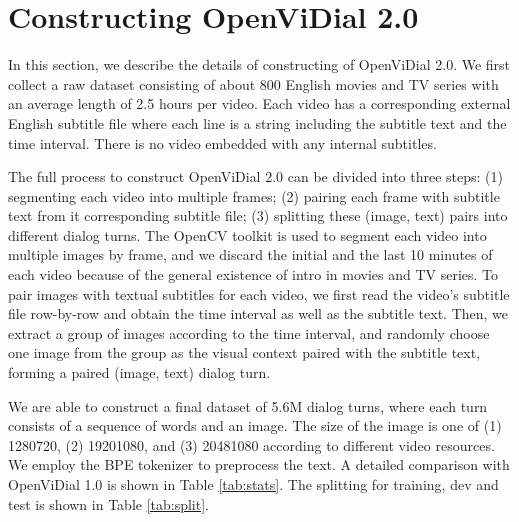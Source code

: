 \documentclass[11pt,a4paper]{article}
\begin{document}
\section{Constructing OpenViDial 2.0}
In this section, we describe the details of constructing of OpenViDial 2.0. We first collect a raw dataset consisting of about 800 English movies and TV series with an average length of 2.5 hours per video. Each video has a corresponding external English subtitle file where each line is a string including the subtitle text and the time interval. There is no video embedded with any internal subtitles.

The full process to construct OpenViDial 2.0 can be divided into three steps: (1) segmenting each video into multiple frames; (2) pairing each frame with subtitle text from it corresponding subtitle file; (3) splitting these (image, text) pairs into different dialog turns. The OpenCV \cite{opencv_library} toolkit is used to segment each video into multiple images by frame, and we discard the initial and the last 10 minutes of each video because of the general existence of intro in movies and TV series. To pair images with textual subtitles for each video, we first read the video's subtitle file row-by-row and obtain the time interval as well as the subtitle text. Then, we extract a group of images according to the time interval, and randomly choose one image from the group as the visual context paired with the subtitle text, forming a paired (image, text) dialog turn.

We are able to construct a final dataset of 5.6M dialog turns, where each turn consists of a sequence of words and an image. The size of the image is one of (1) 1280720, (2) 19201080, and (3) 20481080 according to different video resources. We employ the BPE tokenizer \cite{sennrich-etal-2016-neural} to preprocess the text. A detailed comparison with OpenViDial 1.0 is shown in Table \ref{tab:stats}. The splitting for training, dev and test is shown in Table \ref{tab:split}.
\end{document}
